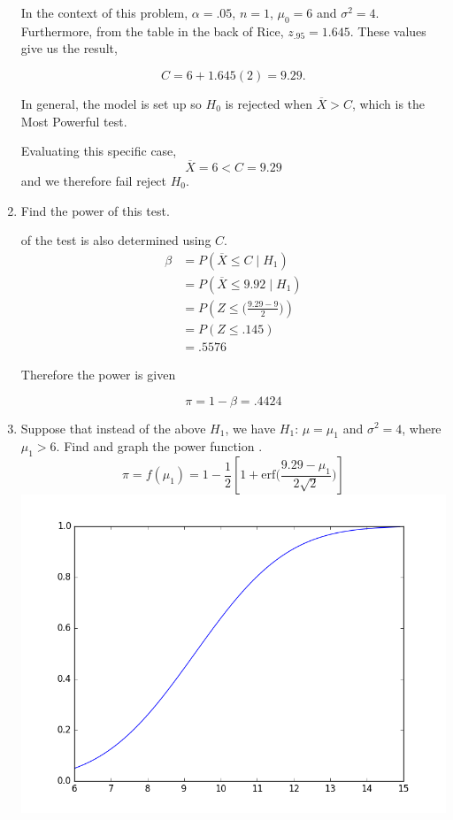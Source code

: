 \documentclass{tufte-book}
\newcommand{\erf}{\mathrm{erf}}
\theoremstyle{mytheoremstyle}
\theoremstyle{mylemstyle}
\theoremstyle{mydefstyle}
\begin{document}
\begin{enumerate}
In the context of this problem, $\alpha=.05$, $n=1$, $\mu_0=6$ and $\sigma^2=4$.  Furthermore, from the table in the back of Rice, $z_{.95} = 1.645$.  These values give us the result,

\[ C = 6 + 1.645(2) = 9.29. \]

In general, the model is set up so $H_0$ is rejected when $\overline{X} > C$, which is the Most Powerful test.

Evaluating this specific case,
\[ \overline{X} = 6 < C = 9.29 \]
and we therefore fail reject $H_0$.

\item Find the power of this test.

 of the test is also determined using $C$.
\begin{align*}
\beta &= P(\overline{X} \leq C \mid H_1)\\
&= P(\overline{X} \leq 9.92 \mid H_1)\\
&= P(Z \leq\Big(\frac{9.29 - 9}{2}\Big))\\
&= P(Z \leq .145)\\
&= .5576
\end{align*}

Therefore the power is given

\[ \pi = 1- \beta = .4424 \]

\item Suppose that instead of the above $H_1$, we have $H_1$: $\mu=\mu_1$ and $\sigma^2=4$, where $\mu_1 > 6$.  Find and graph the power function \marginnote{$\Phi (\frac{x-\mu}{\sigma}) = \frac{1}{2}[1+ \erf(\frac{x-\mu}{\sigma\sqrt{2}})]$}.
\[ \pi = f(\mu_1) = 1 - \frac{1}{2}[1 + \erf\Big(\frac{9.29-\mu_1}{2\sqrt{2}}\Big)] \]
\includegraphics{power}

\end{enumerate}
\end{document}
